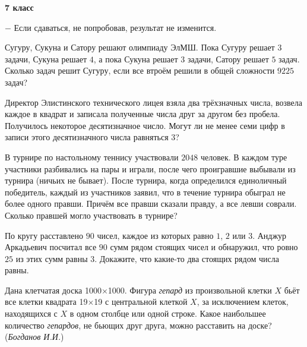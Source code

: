 \hspace{3mm}

\centerline{\bf \huge 7 класс}

\begin{flushright}
        \scriptsize{ $-$ Если сдаваться, не попробовав, результат не изменится.}
\end{flushright}


Сугуру, Сукуна и Сатору решают олимпиаду ЭлМШ. Пока Сугуру решает $3$ задачи, Сукуна решает $4$, а пока Сукуна решает $3$ задачи, Сатору решает $5$ задач. Сколько задач решит Сугуру, если все втроём решили в общей сложности $9225$ задач?


Директор Элистинского технического лицея взяла два трёхзначных числа, возвела каждое в квадрат и записала полученные числа друг за другом без пробела. Получилось некоторое десятизначное число. Могут ли не менее семи цифр в записи этого десятизначного числа равняться 3?

В турнире по настольному теннису участвовали $2048$ человек. В каждом туре участники разбивались на пары и играли, после чего проигравшие выбывали из турнира (ничьих не бывает). После турнира, когда определился единоличный победитель, каждый из участников заявил, что в течение турнира обыграл не более одного правши. Причём все правши сказали правду, а все левши соврали. Сколько правшей могло участвовать в турнире?

По кругу расставлено $90$ чисел, каждое из которых равно $1$, $2$ или $3$. Анджур Аркадьевич посчитал все $90$ сумм рядом стоящих чисел и обнаружил, что ровно $25$ из этих сумм равны $3$. Докажите, что какие-то два стоящих рядом числа равны.


 Дана клетчатая доска 1000$\times$1000. Фигура \textit{гепард} из произвольной клетки $X$ бьёт все клетки квадрата 19$\times$19 с центральной клеткой $X$, за исключением клеток, находящихся с $X$ в одном столбце или одной строке. Какое наибольшее количество \textit{гепардов}, не бьющих друг друга, можно расставить на доске? (\textit{Богданов И.И.})